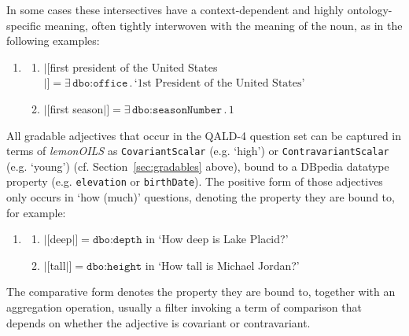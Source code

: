 \documentclass[11pt]{article}
\begin{document}
In some cases these intersectives have a context-dependent and highly ontology-specific meaning, 
often tightly interwoven with the meaning of the noun, as in the following examples:
\begin{enumerate}
\item \begin{enumerate}
\item $|[$first president of the United States$|]=\exists\,\texttt{dbo:office}\,.\,\text{`1st President of the United States'}$
\item $|[$first season$|]=\exists\,\texttt{dbo:seasonNumber}\,.\,1$
\end{enumerate}
\end{enumerate}

All gradable adjectives that occur in the QALD-4 question set can be captured in terms of \emph{lemonOILS} 
as \texttt{CovariantScalar} (e.g. `high') or \texttt{ContravariantScalar} (e.g. `young') (cf. Section~\ref{sec:gradables} above), 
bound to a DBpedia datatype property (e.g. \texttt{elevation} or \texttt{birthDate}). 
The positive form of those adjectives only occurs in `how (much)' questions, denoting the property they are bound to, for example:
\begin{enumerate} 
\item \begin{enumerate}
 \item $|[$deep$|]=\texttt{dbo:depth}$ in `How deep is Lake Placid?'
 \item $|[$tall$|]=\texttt{dbo:height}$ in `How tall is Michael Jordan?'
 \end{enumerate}
\end{enumerate}
The comparative form denotes the property they are bound to, together with an aggregation operation, usually a filter 
invoking a term of comparison that depends on whether the adjective is covariant or contravariant.
\end{document}
